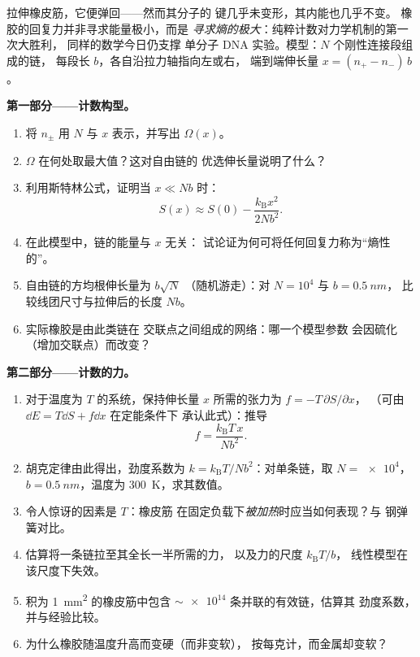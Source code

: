 \begin{problem}\label{pb:b3:microcanonical-ensemble:1}
拉伸橡皮筋，它便弹回——然而其分子的
键几乎未变形，其内能也几乎不变。
橡胶的回复力并非寻求能量极小，而是
\emph{寻求熵的极大}：纯粹计数对力学机制的第一次大胜利，
同样的数学今日仍支撑
单分子 DNA 实验。模型：$N$ 个刚性连接段组成的链，
每段长 $b$，各自沿拉力轴指向左或右，
端到端伸长量 $x = (n_+ - n_-)\,b$。

\medskip\noindent\textbf{第一部分——计数构型。}
\begin{enumerate}
  \item 将 $n_\pm$ 用 $N$ 与 $x$ 表示，并写出
         $\Omega(x)$。
  \item $\Omega$ 在何处取最大值？这对自由链的
        优选伸长量说明了什么？
  \item 利用斯特林公式，证明当 $x \ll Nb$ 时：
        \[
        S(x) \approx S(0) - \frac{k_{\text{B}}x^2}{2Nb^2} .
        \]
  \item 在此模型中，链的能量与 $x$ 无关：
        试论证为何可将任何回复力称为“熵性的”。
  \item 自由链的方均根伸长量为 $b\sqrt N$
        （随机游走）：对 $N = 10^4$ 与 $b = \qty{0.5}{nm}$，
        比较线团尺寸与拉伸后的长度 $Nb$。
  \item 实际橡胶是由此类链在
        交联点之间组成的网络：哪一个模型参数
        会因硫化（增加交联点）而改变？
\end{enumerate}

\medskip\noindent\textbf{第二部分——计数的力。}
\begin{enumerate}[resume]
  \item 对于温度为 $T$ 的系统，保持伸长量
        $x$ 所需的张力为 $f = -T\,\partial S/\partial x$，
        （可由 $\dd E = T\dd S + f\dd x$ 在定能条件下
        承认此式）：推导
        \[
        f = \frac{k_{\text{B}}T\,x}{Nb^2} .
        \]
  \item 胡克定律由此得出，劲度系数为 $k =
        k_{\text{B}}T/Nb^2$：对单条链，取 $N =
        \num{e4}$，$b = \qty{0.5}{nm}$，温度为 \qty{300}{K}，求其数值。
  \item 令人惊讶的因素是 $T$：橡皮筋
        在固定负载下\emph{被加热}时应当如何表现？与
        钢弹簧对比。
  \item 估算将一条链拉至其全长一半所需的力，
        以及力的尺度 $k_{\text{B}}T/b$，
        线性模型在该尺度下失效。
  \item {}积为 \qty{1}{mm^2} 的橡皮筋中包含
        $\sim\num{e14}$ 条并联的有效链，估算其
        劲度系数，并与经验比较。
  \item 为什么橡胶随温度升高而变硬（而非变软），
        按每克计，而金属却变软？
\end{enumerate}


\end{problem}
